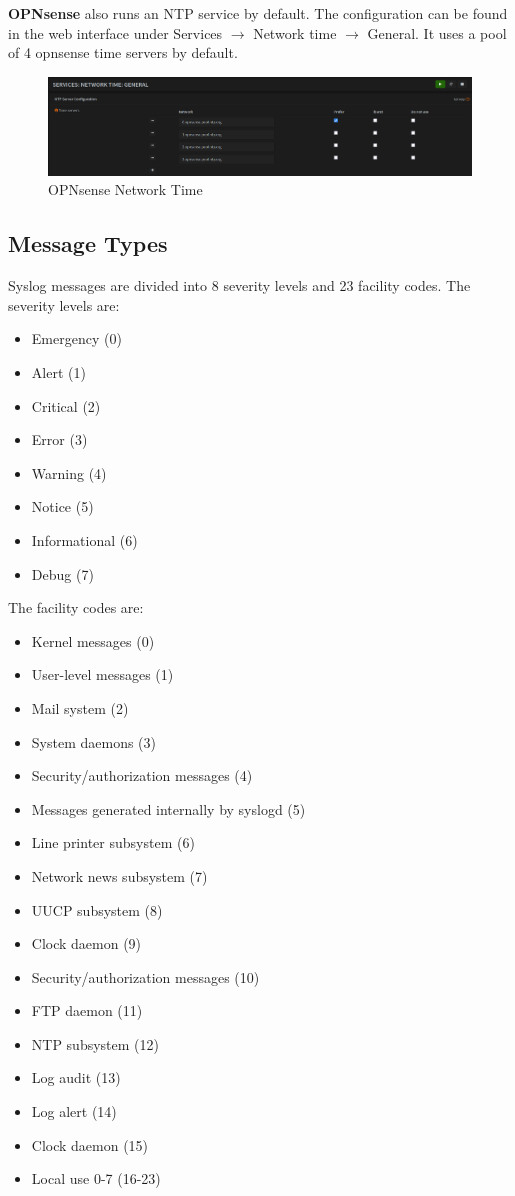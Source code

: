 \textbf{OPNsense} also runs an NTP service by default. The configuration can be found in the web interface under Services $\rightarrow$ Network time $\rightarrow$ General. It uses a pool of 4 opnsense time servers by default.
\begin{figure}[H]
	\centering
	\includegraphics[width=1\linewidth]{Figures/opnsense-ntp.png}
	\caption{OPNsense Network Time}
\end{figure}

\subsection{Message Types}

Syslog messages are divided into 8 severity levels and 23 facility codes. The severity levels are:
\begin{itemize}
    \item Emergency (0)
    \item Alert (1)
    \item Critical (2)
    \item Error (3)
    \item Warning (4)
    \item Notice (5)
    \item Informational (6)
    \item Debug (7)
\end{itemize}
The facility codes are:
\begin{itemize}
    \item Kernel messages (0)
    \item User-level messages (1)
    \item Mail system (2)
    \item System daemons (3)
    \item Security/authorization messages (4)
    \item Messages generated internally by syslogd (5)
    \item Line printer subsystem (6)
    \item Network news subsystem (7)
    \item UUCP subsystem (8)
    \item Clock daemon (9)
    \item Security/authorization messages (10)
    \item FTP daemon (11)
    \item NTP subsystem (12)
    \item Log audit (13)
    \item Log alert (14)
    \item Clock daemon (15)
    \item Local use 0-7 (16-23)
\end{itemize}

